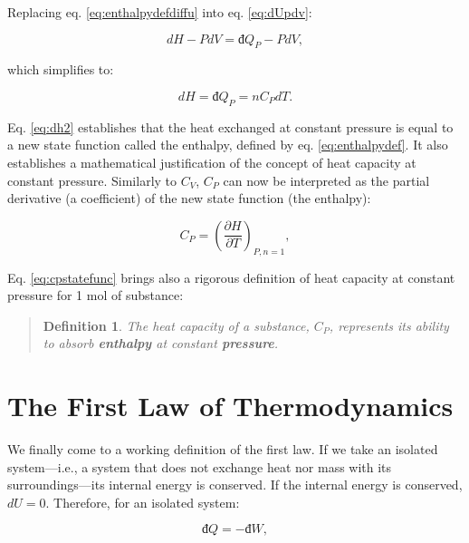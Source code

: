 \documentclass[
  9pt,
]{extbook}
\theoremstyle{definition}
\newtheorem{definition}{Definition}[chapter]
\theoremstyle{definition}
\theoremstyle{definition}
\theoremstyle{definition}
\theoremstyle{remark}
\begin{document}
Replacing eq. \eqref{eq:enthalpydefdiffu} into eq. \eqref{eq:dUpdv}:

\begin{equation}
  dH -PdV = đ Q_P - PdV,
  \label{eq:dh1}
\end{equation}

which simplifies to:

\begin{equation}
  dH = đ Q_P = n C_P dT.
  \label{eq:dh2}
\end{equation}

Eq. \eqref{eq:dh2} establishes that the heat exchanged at constant pressure is equal to a new state function called the enthalpy, defined by eq. \eqref{eq:enthalpydef}. It also establishes a mathematical justification of the concept of heat capacity at constant pressure. Similarly to \(C_V\), \(C_P\) can now be interpreted as the partial derivative (a coefficient) of the new state function (the enthalpy):

\begin{equation}
  C_P = \left( \frac{\partial H} {\partial T} \right)_{P,n=1},
  \label{eq:cpstatefunc}
\end{equation}

Eq. \eqref{eq:cpstatefunc} brings also a rigorous definition of heat capacity at constant pressure for 1 mol of substance:

\begin{quote}
\begin{definition}
\protect\hypertarget{def:newdefcp}{}\label{def:newdefcp}\emph{The heat capacity of a substance, \(C_P\), represents its ability to absorb \textbf{enthalpy} at constant \textbf{pressure}.}
\end{definition}
\end{quote}

\section{The First Law of Thermodynamics}\label{the-first-law-of-thermodynamics}

We finally come to a working definition of the first law. If we take an isolated system---i.e., a system that does not exchange heat nor mass with its surroundings---its internal energy is conserved. If the internal energy is conserved, \(dU=0\). Therefore, for an isolated system:

\begin{equation}
  đ Q = -đ W,
  \label{eq:heateqwork}
\end{equation}
\end{document}
